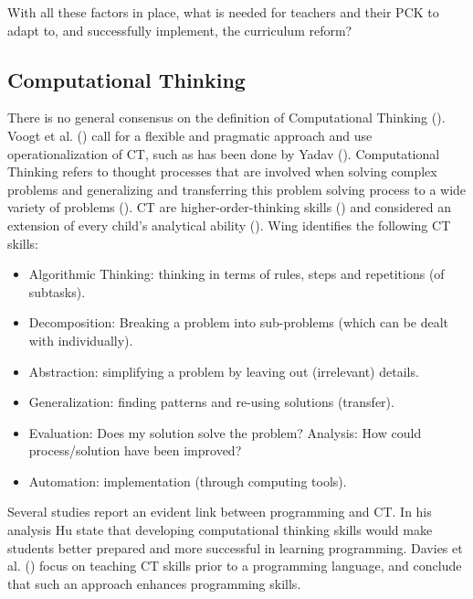 With all these factors in place, what is needed for teachers and their PCK to adapt to, and successfully implement, the curriculum reform?





\subsection{Computational Thinking}

There is no general consensus on the definition of Computational Thinking (\cite{Yadav2015}). Voogt et al. (\cite{voogt2015computational}) call for a flexible and pragmatic approach and use operationalization of CT, such as has been done by Yadav (\cite{Yadav2015}). Computational Thinking refers to thought processes that are involved when solving complex problems and generalizing and transferring this problem solving process to a wide variety of problems (\cite{voogt2015computational}). CT are higher-order-thinking skills  (\cite{Yadav2017CTteacherEd}) and considered an extension of every child's analytical ability (\cite{Wing2006}). Wing identifies the following CT skills:\label{CTdefWing}
\begin{itemize}
\item Algorithmic Thinking: thinking in terms of rules, steps and repetitions (of subtasks).
\item Decomposition: Breaking a problem into sub-problems (which can be dealt with individually).
\item Abstraction: simplifying a problem by leaving out (irrelevant) details.
\item Generalization: finding patterns and re-using solutions (transfer).
\item Evaluation: Does my solution solve the problem? Analysis: How could process/solution have been improved?
\item Automation: implementation (through computing tools).
\end{itemize}




Several studies report an evident link between programming and CT. In his analysis Hu \cite{hu2011computational} state that developing computational thinking skills would make students better prepared and more successful in learning programming. Davies et al. (\cite{davies2008effects}) focus on teaching CT skills prior to a programming language, and conclude that such an approach enhances programming skills.

